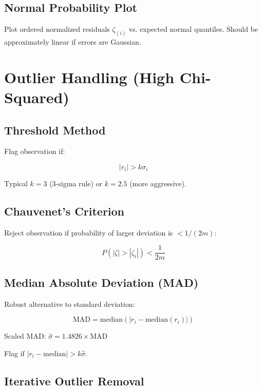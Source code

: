 \subsection{Normal Probability Plot}

Plot ordered normalized residuals $\zeta_{(i)}$ vs. expected normal quantiles. Should be approximately linear if errors are Gaussian.

\section{Outlier Handling (High Chi-Squared)}

\subsection{Threshold Method}

Flag observation if:

\begin{equation}
    |r_i| > k \sigma_i
\end{equation}

Typical $k = 3$ (3-sigma rule) or $k = 2.5$ (more aggressive).

\subsection{Chauvenet's Criterion}

Reject observation if probability of larger deviation is $< 1/(2m)$:

\begin{equation}
    P(|\zeta| > |\zeta_i|) < \frac{1}{2m}
\end{equation}

\subsection{Median Absolute Deviation (MAD)}

Robust alternative to standard deviation:

\begin{equation}
    \text{MAD} = \text{median}(|r_i - \text{median}(r_i)|)
\end{equation}

Scaled MAD: $\hat{\sigma} = 1.4826 \times \text{MAD}$

Flag if $|r_i - \text{median}| > k\hat{\sigma}$.

\subsection{Iterative Outlier Removal}

